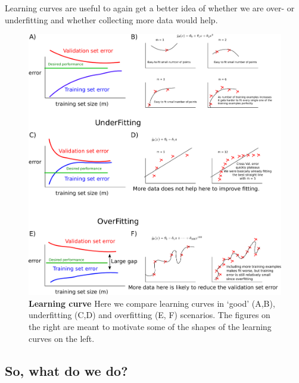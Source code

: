 \documentclass[a4paper, 10pt,hidelinks]{article}
\begin{document}
Learning curves are useful to again get a better idea of whether we are over- or underfitting and whether collecting more data would help.

\begin{figure}[h!]
\includegraphics[width=0.9\linewidth]{LearningCurve}
\caption{\footnotesize{\textbf{Learning curve} Here we compare learning curves in  `good' (A,B), underfitting (C,D) and overfitting (E, F) scenarios. The figures on the right are meant to motivate some of the shapes of the learning curves on the left. }}
\label{Fig: Learning curve}
\end{figure}


\subsection{So, what do we do?}
\end{document}
